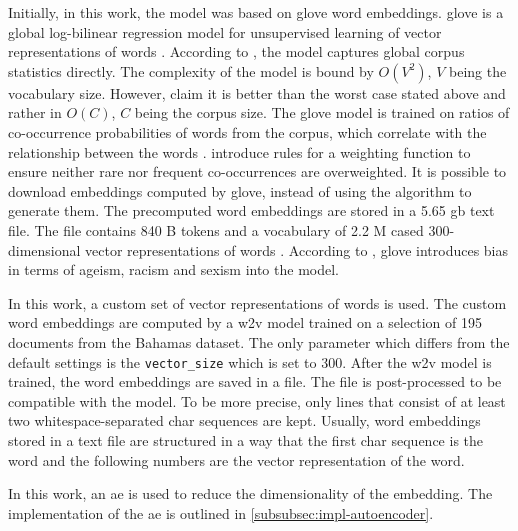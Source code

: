 Initially, in this work, the \infersent{} model was based on \acs{glove} word embeddings.
\acs{glove} is a global log-bilinear regression model for unsupervised learning of vector representations of words \cite{glove2014}. 
According to \citeauthor{glove2014}, the model captures global corpus statistics directly.
The complexity of the model is bound by $O(V^2)$, $V$ being the vocabulary size.
However, \citeauthor{glove2014} claim it is better than the worst case stated above and rather in $O(C)$, $C$ being the corpus size.
The \acs{glove} model is trained on ratios of co-occurrence probabilities of words from the corpus, 
which correlate with the relationship between the words \cite{glove2014}.
\citeauthor{glove2014} introduce rules for a weighting function to ensure neither rare nor frequent co-occurrences are overweighted.
It is possible to download embeddings computed by \acs{glove}, instead of using the algorithm to generate them.
The precomputed word embeddings are stored in a 5.65 \ac{gb} text file.
The file contains 840 B tokens and a vocabulary of 2.2 M cased 300-dimensional vector representations of words \cite{download-glove}.
According to \citeauthor{UniversalSentEnc2018}, \acs{glove} introduces bias in terms of ageism, racism and sexism into the model.

In this work, a custom set of vector representations of words is used.
The custom word embeddings are computed by a \ac{w2v} model trained on a selection of 195 documents from the Bahamas dataset.
The only parameter which differs from the default settings is the \texttt{vector\_size} which is set to 300.
After the \ac{w2v} model is trained, the word embeddings are saved in a file.
The file is post-processed to be compatible with the \infersent{} model.
To be more precise, only lines that consist of at least two whitespace-separated char sequences are kept.
Usually, word embeddings stored in a text file are structured in a way that 
the first char sequence is the word and the following numbers are the vector representation of the word.

In this work, an \ac{ae} is used to reduce the dimensionality of the \infersent{} embedding.
The implementation of the \ac{ae} is outlined in \autoref{subsubsec:impl-autoencoder}.
